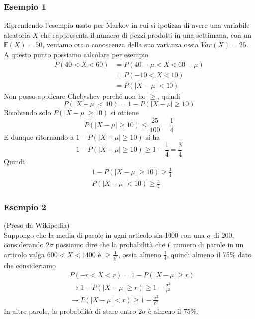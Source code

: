 \documentclass[11pt]{report}
\begin{document}
\subsubsection{Esempio 1}
Riprendendo l'esempio usato per Markov in cui si ipotizza di avere una variabile aleatoria $X$ che rappresenta il numero di pezzi prodotti in una settimana, con un $\mathbb{E}(X) = 50$, veniamo ora a conoscenza della sua varianza ossia $Var(X) = 25$. A questo punto possiamo calcolare per esempio
\begin{equation}
    \begin{split}
        P(40 < X < 60) & = P(40 - \mu < X < 60 - \mu)\\
        & = P(-10 < X < 10)\\
        & = P(\mid X - \mu \mid < 10)
    \end{split}
\end{equation}
Non posso applicare Chebyshev perché non ho $\geq$, quindi
\begin{equation}
    P(\mid X - \mu \mid < 10) = 1 - P(\mid X - \mu \mid \geq 10)
\end{equation}
Risolvendo solo $P(\mid X - \mu \mid \geq 10)$ si ottiene
\begin{equation}
    P(\mid X - \mu \mid \geq 10) \leq \frac{25}{100} = \frac{1}{4}
\end{equation}
E dunque ritornando a $1 - P(\mid X - \mu \mid \geq 10)$ si ha
\begin{equation}
    1 - P(\mid X - \mu \mid \geq 10) \geq 1 - \frac{1}{4} = \frac{3}{4}
\end{equation}
Quindi
\begin{equation}
    \begin{split}
        & 1 - P(\mid X - \mu \mid \geq 10) \geq \frac{3}{4}\\
        & P(\mid X - \mu \mid < 10) \geq \frac{3}{4}
    \end{split}
\end{equation}
\subsubsection{Esempio 2}
{\footnotesize (Preso da Wikipedia)}\\
Suppongo che la media di parole in ogni articolo sia 1000 con una $\sigma$ di 200, considerando $2\sigma$ possiamo dire che la probabilità che il numero di parole in un articolo valga $600 < X < 1400$ è $\geq \frac{1}{k^2}$, ossia almeno $\frac{1}{4}$, quindi almeno il 75\% dato che consideriamo
\begin{equation}
	\begin{split}
		& P(-r < X < r) = 1 - P(\mid X - \mu \mid \geq r)\\
		& \rightarrow 1 - P(\mid X - \mu \mid \geq r) \geq 1 - \frac{\sigma^2}{r^2}\\
		& \rightarrow P(\mid X - \mu \mid < r) \geq 1 - \frac{\sigma^2}{r^2}
	\end{split}
\end{equation}
In altre parole, la probabilità di stare entro 2$\sigma$ è almeno il 75\%.
\end{document}
